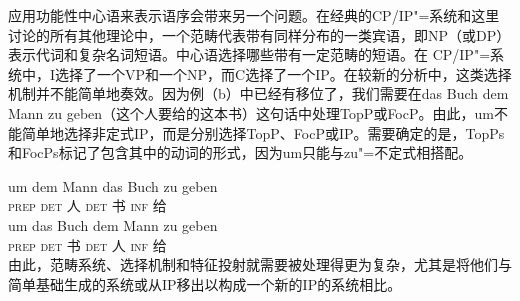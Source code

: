应用功能性中心语来表示语序会带来另一个问题。在经典的CP/IP"=系统和这里讨论的所有其他理论中，一个范畴代表带有同样分布的一类宾语，即NP（或DP）表示代词和复杂名词短语。中心语选择哪些带有一定范畴的短语。在
CP/IP"=系统中，I选择了一个VP和一个NP，而C选择了一个IP。在较新的分析中，这类选择机制并不能简单地奏效。因为例（b）中已经有移位了，我们需要在das Buch dem Mann zu
geben（这个人要给的这本书）这句话中处理TopP或FocP。由此，um不能简单地选择非定式IP，而是分别选择TopP、FocP或IP。需要确定的是，TopPs和FocPs标记了包含其中的动词的形式，因为um只能与zu"=不定式相搭配。

\eal
\ex 
\gll um dem Mann das Buch zu geben\\
     \textsc{prep} \textsc{det} 人 \textsc{det} 书 \textsc{inf} 给\\
\ex 
\gll um das Buch dem Mann zu geben\\
     \textsc{prep} \textsc{det} 书 \textsc{det} 人 \textsc{inf} 给\\
\zl
由此，范畴系统、选择机制和特征投射就需要被处理得更为复杂，尤其是将他们与简单基础生成的系统或从IP移出以构成一个新的IP的系统相比。

